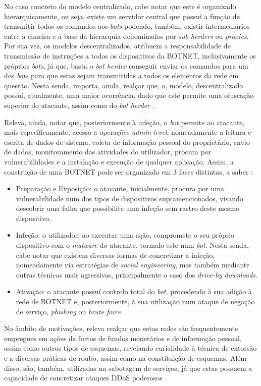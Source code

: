 No caso concreto do modelo centralizado, cabe notar que este é organizado hierarquicamente, ou seja, existe um servidor central que possuí a função de transmitir todos os comandos aos \textit{bots} podendo, também, existir intermediários entre a cimeira e a base da hierarquia denominados por \textit{sub-herders} ou \textit{proxies}. Por sua vez, os modelos descentralizados, atribuem a responsabilidade de transmissão de instruções a todos os dispositivos da BOTNET, inclusivamente os próprios \textit{bots}, já que, basta o \textit{bot herder} conseguir enviar os comandos para um dos \textit{bots} para que estas sejam transmitidas a todos os elementos da rede em questão. Nesta senda, importa, ainda, realçar que, o, modelo, descentralizado possuí, atualmente, uma maior ocorrência, dado que este permite uma ofuscação superior do atacante, assim como do \textit{bot herder} \cite{kaspersky_botnets_2017}.


Releva, ainda, notar que, posteriormente à infeção, o \textit{bot} permite ao atacante, mais especificamente, acesso a operações \textit{admin-level}, nomeadamente a leitura e escrita de dados de sistema, coleta de informação pessoal do proprietário, envio de dados, monitoramento das atividades do utilizador, procura por vulnerabilidades e a instalação e execução de qualquer aplicação. Assim, a construção de uma BOTNET pode ser organizada em 3 fases distintas, a saber \cite{kaspersky_botnets_2017}:
\begin{itemize}
    \item Preparação e Exposição: o atacante, inicialmente, procura por uma vulnerabilidade num dos tipos de dispositivos supramencionados, visando descobrir uma falha que possibilite uma infeção sem rastro deste mesmo dispositivo.
    \item Infeção: o utilizador, ao executar uma ação, compromete o seu próprio dispositivo com o \textit{malware} do atacante, tornado este num \textit{bot}. Nesta senda, cabe notar que existem diversas formas de concretizar a infeção, nomeadamente via estratégias de \textit{social engineering}, mas também mediante outras técnicas mais agressivas, principalmente o caso dos \textit{drive-by downloads}.
    \item Ativação: o atacante possuí controlo total do \textit{bot}, procedendo à sua adição à rede de BOTNET e, posteriormente, à sua utilização num ataque de negação de serviço, \textit{phishing} ou \textit{brute force}.
\end{itemize}

No âmbito de motivações, releva realçar que estas redes são frequentemente empregues em ações de furtos de fundos monetários e de informação pessoal, assim como outros tipos de esquemas, revelando curialidade à técnica de extorsão e a diversas práticas de roubo, assim como na constituição de esquemas. Além disso, são, também, utilizadas na sabotagem de serviços, já que estas possuem a capacidade de concretizar ataques DDoS poderosos \cite{kaspersky_botnets_2017}.

